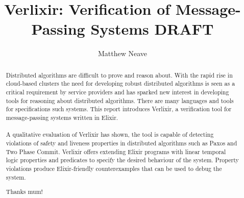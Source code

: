 \documentclass[a4paper, twoside]{report}
\title{Verlixir: Verification of Message-Passing Systems DRAFT}
\author{Matthew Neave}
\begin{document}


\begin{abstract}
    Distributed algorithms are difficult to prove and reason about. With the rapid rise in cloud-based clusters the need for developing robust distributed algorithms is seen as a critical requirement by service providers and has sparked new interest in developing tools for reasoning about distributed algorithms. There are many languages and tools for specifications such systems. This report introduces Verlixir, a verification tool for message-passing systems written in Elixir.
    \\ \\
    A qualitative evaluation of Verlixir has shown, the tool is capable of detecting violations of safety and liveness properties in distributed algorithms such as Paxos and Two Phase Commit. Verlixir offers extending Elixir programs with linear temporal logic properties and predicates to specify the desired behaviour of the system. Property violations produce Elixir-friendly counterexamples that can be used to debug the system.
\end{abstract}
\renewcommand{\abstractname}{Acknowledgements}
\begin{abstract}
Thanks mum!
\end{abstract}

\tableofcontents
\listoffigures
\lstlistoflistings

% 







% 
% 



% 
% 
\end{document}
